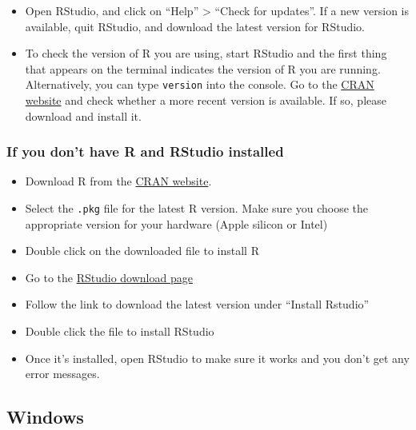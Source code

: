 \documentclass[
]{book}
\providecommand{\tightlist}{%
  \setlength{\itemsep}{0pt}\setlength{\parskip}{0pt}}
\begin{document}
\begin{itemize}
\tightlist
\item
  Open RStudio, and click on ``Help'' \textgreater{} ``Check for updates''. If a new version is
  available, quit RStudio, and download the latest version for RStudio.
\item
  To check the version of R you are using, start RStudio and the first thing
  that appears on the terminal indicates the version of R you are running. Alternatively, you can type \texttt{version} into the console. Go to
  the \href{https://cran.r-project.org/bin/macosx/}{CRAN website} and check
  whether a more recent version is available. If so, please download and install
  it.
\end{itemize}

\subsubsection*{\texorpdfstring{If you \textbf{don't} have R and RStudio installed}{If you don't have R and RStudio installed}}\label{if-you-dont-have-r-and-rstudio-installed}

\begin{itemize}
\tightlist
\item
  Download R from
  the \href{http://cran.r-project.org/bin/macosx}{CRAN website}.
\item
  Select the \texttt{.pkg} file for the latest R version. Make sure you choose the appropriate version for your hardware (Apple silicon or Intel)
\item
  Double click on the downloaded file to install R
\item
  Go to the \href{https://posit.co/download/rstudio-desktop/}{RStudio download page}
\item
  Follow the link to download the latest version under ``Install Rstudio''
\item
  Double click the file to install RStudio
\item
  Once it's installed, open RStudio to make sure it works and you don't get any
  error messages.
\end{itemize}

\subsection*{Windows}\label{windows}
\end{document}
